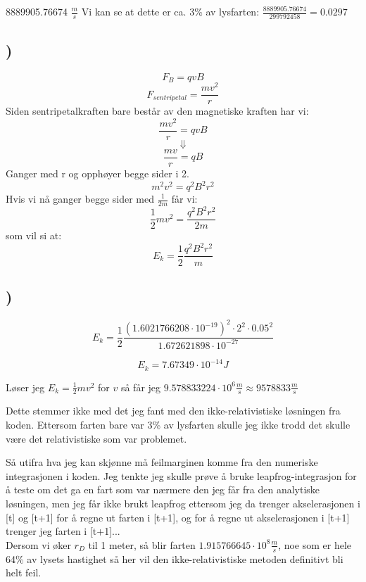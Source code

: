 \documentclass[report,12pt,norsk]{article}
\begin{document}
8889905.76674 $\frac{m}{s}$
Vi kan se at dette er ca. 3\% av lysfarten:
$\frac{8889905.76674}{299 792 458} = 0.0297$

\subsection{)}
\begin{center}
\[F_{B} = qvB\]
\[F_{sentripetal} = \frac{mv^{2}}{r}\]
Siden sentripetalkraften bare består av den magnetiske kraften har vi:
\[\frac{mv^{2}}{r} = qvB\]
\[\Downarrow\]
\[\frac{mv}{r} = qB\]
Ganger med r og opphøyer begge sider i 2.
\[m^{2}v^{2} = q^{2}B^{2}r^{2}\]
Hvis vi nå ganger begge sider med $\frac{1}{2m}$ får vi:
\[\frac{1}{2}mv^{2} = \frac{q^{2}B^{2}r^{2}}{2m}\]
som vil si at:
\[E_{k} = \frac{1}{2}\frac{q^{2}B^{2}r^{2}}{m}\]
\end{center}
\subsection{)}

\[E_{k} = \frac{1}{2}\frac{(1.6021766208\cdot10^{-19})^{2} \cdot 2^{2} \cdot 0.05^{2}}{1.672621898\cdot10^{-27}}\]

\[E_{k} = 7.67349 \cdot 10^{-14} J\]

Løser jeg $E_{k} = \frac{1}{2}mv^{2}$ for $v$ så får jeg $9.578833224 \cdot 10^{6} \frac{m}{s} \approx 9578833 \frac{m}{s}$

Dette stemmer ikke med det jeg fant med den ikke-relativistiske løsningen fra koden. Ettersom farten bare var 3\% av lysfarten skulle jeg ikke trodd det skulle være det relativistiske som var problemet. 

Så utifra hva jeg kan skjønne må feilmarginen komme fra den numeriske integrasjonen i koden. Jeg tenkte jeg skulle prøve å bruke leapfrog-integrasjon for å teste om det ga en fart som var nærmere den jeg får fra den analytiske løsningen, men jeg får ikke brukt leapfrog ettersom jeg da trenger akselerasjonen i [t] og [t+1] for å regne ut farten i [t+1], og for å regne ut akselerasjonen i [t+1] trenger jeg farten i [t+1]... \\

Dersom vi øker $r_{D}$ til 1 meter, så blir farten $1.915766645 \cdot 10^{8}\frac{m}{s}$, noe som er hele 64\% av lysets hastighet så her vil den ikke-relativistiske metoden definitivt bli helt feil.

\section{}
\end{document}
